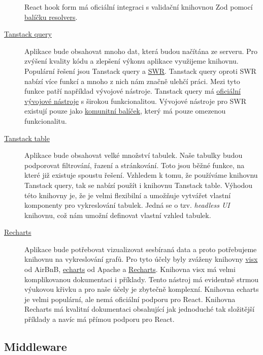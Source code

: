 \begin{description}
    React hook form má oficiální integraci s validační knihovnou Zod pomocí \href{https://github.com/react-hook-form/resolvers}{balíčku resolvers}.
    \item[\href{https://tanstack.com/query/latest}{Tanstack query}]
    Aplikace bude obsahovat mnoho dat, která budou načítána ze serveru.
    Pro zvýšení kvality kódu a zlepšení výkonu aplikace využijeme knihovnu.
    Populární řešení jsou Tanstack query a \href{https://swr.vercel.app/}{SWR}\@.
    Tanstack query oproti SWR nabízí více funkcí a mnoho z nich nám značně ulehčí práci.
    Mezi tyto funkce patří například vývojové nástroje.
    Tanstack query má \href{https://tanstack.com/query/v4/docs/react/devtools}{oficiální vývojové nástroje} s širokou funkcionalitou.
    Vývojové nástroje pro SWR existují pouze jako \href{https://github.com/koba04/swr-devtools}{komunitní balíček}, který má pouze omezenou funkcionalitu.
    \item[\href{https://tanstack.com/table/v8}{Tanstack table}]
    Aplikace bude obsahovat velké množství tabulek.
    Naše tabulky budou podporovat filtrování, řazení a stránkování.
    Toto jsou běžné funkce, na které již existuje spoustu řešení.
    Vzhledem k tomu, že používáme knihovnu Tanstack query, tak se nabízí použít i knihovnu Tanstack table.
    Výhodou této knihovny je, že je velmi flexibilní a umožňuje vytvářet vlastní komponenty pro vykreslování tabulek.
    Jedná se o tzv. \textit{headless UI} knihovnu, což nám umožní definovat vlastní vzhled tabulek.
    \item[\href{https://recharts.org/en-US/}{Recharts}]
    Aplikace bude potřebovat vizualizovat sesbíraná data a proto potřebujeme knihovnu na vykreslování grafů.
    Pro tyto účely byly zváženy knihovny \href{https://github.com/airbnb/visx}{visx} od AirBnB, \href{https://github.com/apache/echarts}{echarts} od Apache a \href{https://github.com/recharts/recharts}{Recharts}.
    Knihovna visx má velmi komplikovanou dokumentaci i příklady.
    Tento nástroj má evidentně strmou výukovou křivku a pro naše účely je zbytečně komplexní.
    Knihovna echarts je velmi populární, ale nemá oficiální podporu pro React.
    Knihovna Recharts má kvalitní dokumentaci obsahující jak jednoduché tak složitější příklady a navíc má přímou podporu pro React.
\end{description}

\subsection{Middleware}\label{subsec:middleware}

